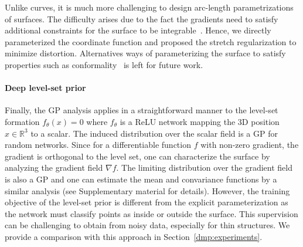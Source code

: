 Unlike curves, it is much more challenging to design arc-length parametrizations of surfaces. 
The difficulty arises due to the fact the gradients need to satisfy additional constraints for the surface to be
integrable~\cite{sussmann1973orbits}. 
Hence, we directly parameterized the coordinate function and proposed the stretch regularization to minimize distortion.
Alternatives ways of parameterizing the surface to satisfy properties such as conformality~\cite{nehari2012conformal} is left for future work.

\paragraph*{Deep level-set prior} Finally, the GP analysis applies in a straightforward manner to the level-set formation $f_\theta(x) = 0$ where $f_\theta$ is a ReLU network 
mapping the 3D position $x \in \mathbb{R}^3$ to a scalar. The induced distribution over the
scalar field is a GP for random networks. Since for a differentiable function $f$ with non-zero gradient, the gradient is orthogonal to the level set, one can characterize the surface by analyzing the gradient field $\nabla f$. The limiting distribution over the gradient field is also a GP and one can estimate the mean and convariance functions by a similar analysis (see Supplementary material for details).
However, the training objective of the level-set prior is different from the explicit parameterization as the network must classify points as inside or outside the surface. This supervision can be challenging to obtain from noisy
data, especially for thin structures. We provide a comparison with this
approach in Section~\ref{dmp:experiments}. 




